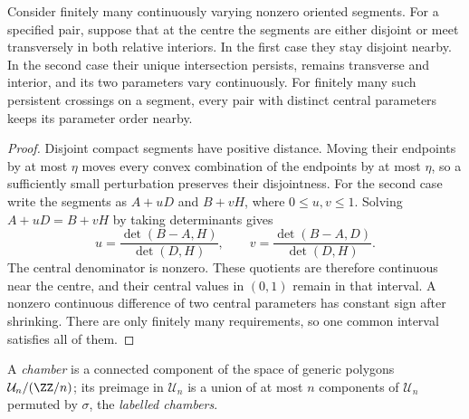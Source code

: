 \begin{lemma}
\label{lem:wall-segment-stability}\leanok
Consider finitely many continuously varying nonzero oriented segments.
For a specified pair, suppose that at the centre the segments are either
disjoint or meet transversely in both relative interiors. In the first case
they stay disjoint nearby. In the second case their unique intersection
persists, remains transverse and interior, and its two parameters vary
continuously. For finitely many such persistent crossings on a segment,
every pair with distinct central parameters keeps its parameter order nearby.

\end{lemma}
\begin{proof}\leanok
Disjoint compact segments have positive distance. Moving their endpoints by
at most $\eta$ moves every convex combination of the endpoints by at most
$\eta$, so a sufficiently small perturbation preserves their disjointness.
For the second case write the segments as $A+uD$ and $B+vH$, where
$0\leq u,v\leq1$. Solving $A+uD=B+vH$ by taking determinants gives
\begin{equation}\label{wallgeo:parameters}
 u=\frac{\det(B-A,H)}{\det(D,H)},\qquad
 v=\frac{\det(B-A,D)}{\det(D,H)}.
\end{equation}
The central denominator is nonzero. These quotients are therefore continuous
near the centre, and their central values in $(0,1)$ remain in that interval.
A nonzero continuous difference of two central parameters has constant sign
after shrinking. There are only finitely many requirements, so one common
interval satisfies all of them.
\end{proof}

\begin{definition}[chambers]\label{def:chamber}\leanok
A \emph{chamber} is a connected component of the space of generic polygons
$\mathcal U_n/(\ZZ/n)$; its preimage in $\mathcal U_n$ is a union of at most
$n$ components of $\mathcal U_n$ permuted by $\sigma$, the \emph{labelled
chambers}.
\end{definition}

